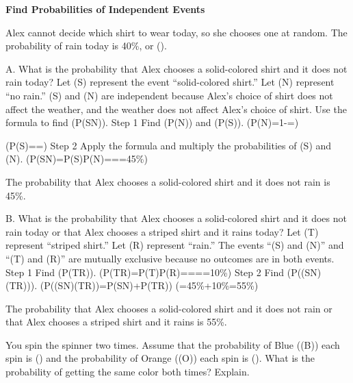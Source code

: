\documentclass{article}
\newenvironment{example}[1]{}{}         %
\newenvironment{tryit}[1]{}{}           %
\newcommand{\answer}[1]{}               %
\newcommand{\placeholder}[2]{}          %
\newcommand{\te}[1]{}                   %
\begin{document}
\begin{example}{4}
\textbf{Find Probabilities of Independent Events}
\te{APPLICATION}
Alex cannot decide which shirt to wear today, so she chooses one at random.
The probability of rain today is 40\%, or ().
\placeholder{illustration}{Four shirts hanging side by side on wooden hangers against green background: solid pale yellow button shirt, solid dark blue shirt, solid yellow shirt, green striped shirt.}
A. What is the probability that Alex chooses a solid-colored shirt and it does not rain today?
Let (S) represent the event “solid-colored shirt.” Let (N) represent “no rain.”
(S) and (N) are independent because Alex's choice of shirt does not affect the weather, and the weather does not affect Alex's choice of shirt. Use the formula to find (P(SN)).
Step 1 Find (P(N)) and (P(S)).
(P(N)=1-=)
\te{Callout: Subtract the probability that it will rain, (\frac25), from 1 to find the probability that it will not rain.}
(P(S)==)
Step 2 Apply the formula and multiply the probabilities of (S) and (N).
(P(SN)=P(S)\cdot P(N)=\cdot{}==45\%)
\te{Callout: Use the rule for the probability of independent events.}
The probability that Alex chooses a solid-colored shirt and it does not rain is 45\%.
\answer{A. 45\%}
B. What is the probability that Alex chooses a solid-colored shirt and it does not rain today or that Alex chooses a striped shirt and it rains today?
Let (T) represent “striped shirt.” Let (R) represent “rain.”
The events “(S) and (N)” and “(T) and (R)” are mutually exclusive because no outcomes are in both events.
Step 1 Find (P(TR)).
(P(TR)=P(T)\cdot P(R)=\cdot{}===10\%)
Step 2 Find (P((SN)(TR))).
(P((SN)(TR))=P(SN)+P(TR))
(=45\%+10\%=55\%)
\te{Callout: Add to find the probability that either event will occur.}
The probability that Alex chooses a solid-colored shirt and it does not rain or that Alex chooses a striped shirt and it rains is 55\%.
\answer{B. 55\%}
\te{STUDY TIP You can write probabilities as fractions, decimals, or percents. Choose the most convenient form for your purposes.}
\end{example}
\begin{tryit}{4}
You spin the spinner two times. Assume that the probability of Blue ((B)) each spin is () and the probability of Orange ((O)) each spin is (). What is the probability of getting the same color both times? Explain.
\placeholder{diagram}{Circular spinner: blue upper-left sector B occupying one third, orange sector O occupying remaining two thirds. Boundary radii vertical up and down-left. Black pointer from center toward upper right.}
\answer{(\frac59); since getting blue twice and getting orange twice are mutually exclusive events, add (P(BB)) and (P(OO)). (P(BB)=P(B)\cdot P(B)=\frac13\cdot\frac13=\frac19); (P(OO)=P(O)\cdot P(O)=\frac23\cdot\frac23=\frac49). (P(\text{match})=P(BB)+P(OO)=\frac19+\frac49=\frac59).}
\end{tryit}
\end{document}
